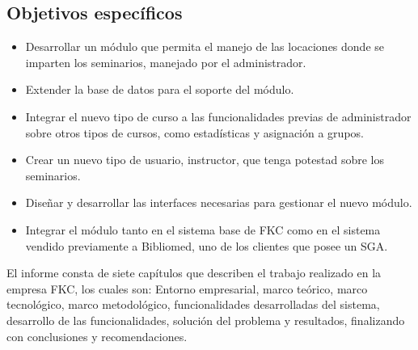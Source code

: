 \subsection*{Objetivos específicos}

\begin{itemize}
	\item Desarrollar un módulo que permita el manejo de las locaciones donde se imparten los seminarios, manejado por el administrador.
	\item Extender la base de datos para el soporte del módulo.
	\item Integrar el nuevo tipo de curso a las funcionalidades previas de administrador sobre otros tipos de cursos, como estadísticas y asignación a grupos.
	\item Crear un nuevo tipo de usuario, instructor, que tenga potestad sobre los seminarios.
	\item Diseñar y desarrollar las interfaces necesarias para gestionar el nuevo módulo.
	\item Integrar el módulo tanto en el sistema base de \gls{FKC} como en el sistema vendido previamente a Bibliomed, uno de los clientes que posee un \gls{SGA}.
\end{itemize}

El informe consta de siete capítulos que describen el trabajo realizado en la empresa FKC, los cuales son: Entorno empresarial, marco teórico, marco tecnológico, marco metodológico, funcionalidades desarrolladas del sistema, desarrollo de las funcionalidades, solución del problema y resultados, finalizando con conclusiones y recomendaciones.







